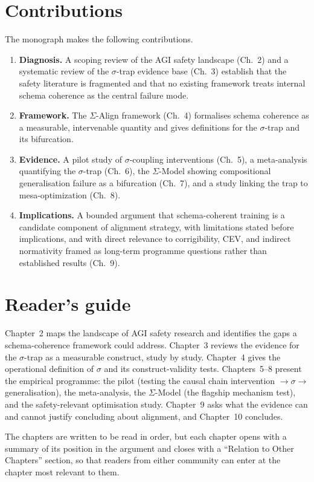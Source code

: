 \section{Contributions}

The monograph makes the following contributions.

\begin{enumerate}
  \item \textbf{Diagnosis.} A scoping review of the AGI safety landscape (Ch.~2) and a
    systematic review of the $\sigma$-trap evidence base (Ch.~3) establish that the
    safety literature is fragmented and that no existing framework treats internal
    schema coherence as the central failure mode.
  \item \textbf{Framework.} The $\Sigma$-Align framework (Ch.~4) formalises schema
    coherence as a measurable, intervenable quantity and gives definitions for the
    $\sigma$-trap and its bifurcation.
  \item \textbf{Evidence.} A pilot study of $\sigma$-coupling interventions (Ch.~5),
    a meta-analysis quantifying the $\sigma$-trap (Ch.~6), the $\Sigma$-Model showing
    compositional generalisation failure as a bifurcation (Ch.~7), and a study linking
    the trap to mesa-optimization (Ch.~8).
  \item \textbf{Implications.} A bounded argument that schema-coherent training is a
    candidate component of alignment strategy, with limitations stated before
    implications, and with direct relevance to corrigibility, CEV, and indirect
    normativity framed as long-term programme questions rather than established
    results (Ch.~9).
\end{enumerate}

\section{Reader's guide}

Chapter~2 maps the landscape of AGI safety research and identifies the gaps a
schema-coherence framework could address. Chapter~3 reviews the evidence for the
$\sigma$-trap as a measurable construct, study by study. Chapter~4 gives the
operational definition of $\sigma$ and its construct-validity tests. Chapters~5--8
present the empirical programme: the pilot (testing the causal chain
intervention $\rightarrow \sigma \rightarrow$ generalisation), the meta-analysis,
the $\Sigma$-Model (the flagship mechanism test), and the safety-relevant
optimisation study. Chapter~9 asks what the evidence can and cannot justify
concluding about alignment, and Chapter~10 concludes.

The chapters are written to be read in order, but each chapter opens with a summary of
its position in the argument and closes with a ``Relation to Other Chapters'' section,
so that readers from either community can enter at the chapter most relevant to them.
